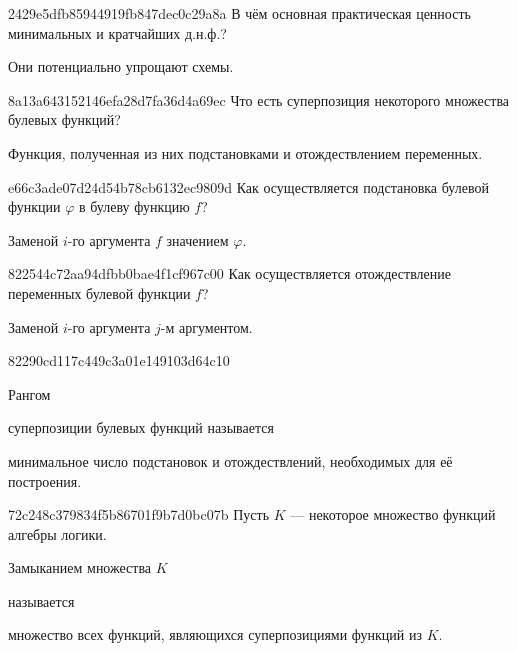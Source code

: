 \begin{note}{2429e5dfb85944919fb847dec0c29a8a}
    В чём основная практическая ценность минимальных и кратчайших д.н.ф.?

    \begin{cloze}{1}
        Они потенциально упрощают схемы.
   \end{cloze}
\end{note}

\begin{note}{8a13a643152146efa28d7fa36d4a69ec}
    Что есть суперпозиция некоторого множества булевых функций?

    \begin{cloze}{1}
        Функция, полученная из них подстановками и отождествлением переменных.
    \end{cloze}
\end{note}

\begin{note}{e66c3ade07d24d54b78cb6132ec9809d}
    Как осуществляется подстановка булевой функции \({ \varphi }\) в булеву функцию \({ f }\)?

    \begin{cloze}{1}
        Заменой \({ i }\)-го аргумента \({ f }\) значением \({ \varphi }\).
    \end{cloze}
\end{note}

\begin{note}{822544c72aa94dfbb0bae4f1cf967c00}
    Как осуществляется отождествление переменных булевой функции \({ f }\)?

    \begin{cloze}{1}
        Заменой \({ i }\)-го аргумента \({ j }\)-м аргументом.
    \end{cloze}
\end{note}

\begin{note}{82290cd117c449c3a01e149103d64c10}
    \begin{icloze}{2}Рангом\end{icloze} суперпозиции булевых функций называется \begin{icloze}{1}минимальное число подстановок и отождествлений, необходимых для её построения.\end{icloze}
\end{note}

\begin{note}{72c248c379834f5b86701f9b7d0bc07b}
    Пусть \({ K }\) --- некоторое множество функций алгебры логики.
    \begin{icloze}{2}Замыканием множества \({ K }\)\end{icloze} называется \begin{icloze}{1}множество всех функций, являющихся суперпозициями функций из \({ K }\).\end{icloze}
\end{note}

